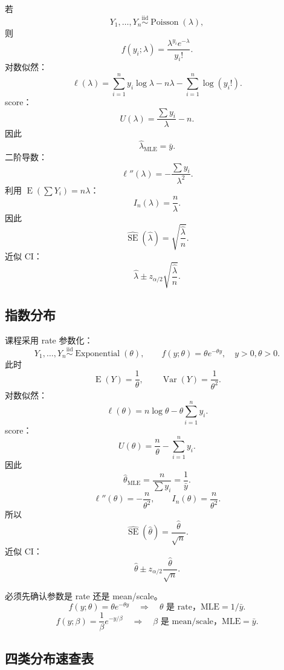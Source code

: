 \documentclass[11pt,a4paper]{article}
\newcommand{\E}{\operatorname{E}}
\newcommand{\Var}{\operatorname{Var}}
\newcommand{\SE}{\operatorname{SE}}
\newcommand{\iid}{\overset{\mathrm{iid}}{\sim}}
\newcommand{\1}{\mathbf{1}}
\begin{document}
若
\[
  Y_1,\ldots,Y_n\iid\operatorname{Poisson}(\lambda),
\]
则
\[
  f(y_i;\lambda)
  =
  \frac{\lambda^{y_i}e^{-\lambda}}{y_i!}.
\]
对数似然：
\[
  \ell(\lambda)
  =
  \sum_{i=1}^ny_i\log\lambda
  -
  n\lambda
  -
  \sum_{i=1}^n\log(y_i!).
\]
score：
\[
  U(\lambda)
  =
  \frac{\sum y_i}{\lambda}-n.
\]
因此
\[
  \boxed{\hat\lambda_{\mathrm{MLE}}=\bar y.}
\]
二阶导数：
\[
  \ell''(\lambda)
  =
  -\frac{\sum y_i}{\lambda^2}.
\]
利用 $\E(\sum Y_i)=n\lambda$：
\[
  \boxed{
  I_n(\lambda)=\frac n\lambda.
  }
\]
因此
\[
  \boxed{
  \widehat{\SE}(\hat\lambda)
  =
  \sqrt{\frac{\hat\lambda}{n}}.
  }
\]
近似 CI：
\[
  \boxed{
  \hat\lambda
  \pm
  z_{\alpha/2}\sqrt{\frac{\hat\lambda}{n}}.
  }
\]

\subsection{指数分布}

课程采用 rate 参数化：
\[
  Y_1,\ldots,Y_n\iid\operatorname{Exponential}(\theta),
\qquad
  f(y;\theta)=\theta e^{-\theta y},
\quad y>0,\theta>0.
\]
此时
\[
  \E(Y)=\frac1\theta,
  \qquad
  \Var(Y)=\frac1{\theta^2}.
\]
对数似然：
\[
  \ell(\theta)
  =
  n\log\theta-\theta\sum_{i=1}^ny_i.
\]
score：
\[
  U(\theta)
  =
  \frac n\theta-\sum_{i=1}^ny_i.
\]
因此
\[
  \boxed{
  \hat\theta_{\mathrm{MLE}}
  =
  \frac{n}{\sum y_i}
  =
  \frac1{\bar y}.
  }
\]
\[
  \ell''(\theta)=-\frac n{\theta^2},
\qquad
  \boxed{I_n(\theta)=\frac n{\theta^2}.}
\]
所以
\[
  \boxed{
  \widehat{\SE}(\hat\theta)
  =
  \frac{\hat\theta}{\sqrt n}.
  }
\]
近似 CI：
\[
  \boxed{
  \hat\theta
  \pm
  z_{\alpha/2}\frac{\hat\theta}{\sqrt n}.
  }
\]

\begin{warnbox}[指数分布参数化]
必须先确认参数是 rate 还是 mean/scale。
\[
  f(y;\theta)=\theta e^{-\theta y}
  \quad\Rightarrow\quad
  \theta\text{ 是 rate，MLE}=1/\bar y.
\]
\[
  f(y;\beta)=\frac1\beta e^{-y/\beta}
  \quad\Rightarrow\quad
  \beta\text{ 是 mean/scale，MLE}=\bar y.
\]
\end{warnbox}

\subsection{四类分布速查表}
\end{document}
